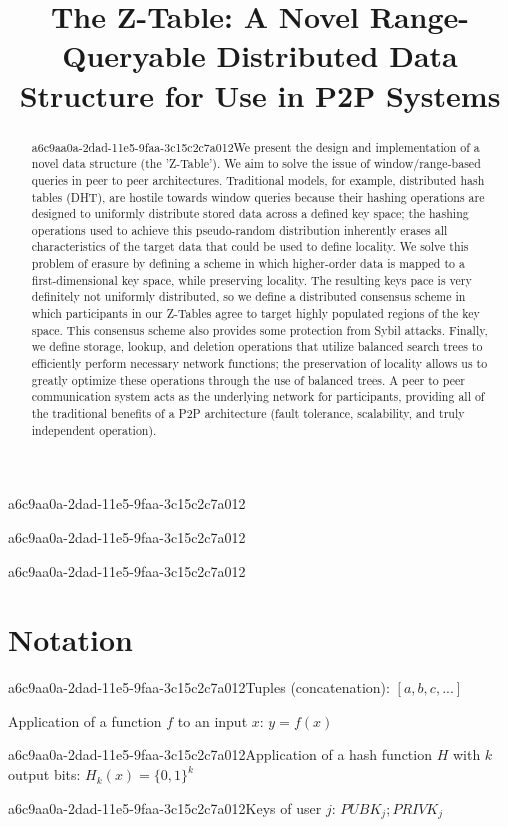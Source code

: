 \documentclass[12pt]{article}
\title{The Z-Table: A Novel Range-Queryable Distributed Data Structure for Use in P2P Systems}
\begin{document}
a6c9aa0a-2dad-11e5-9faa-3c15c2c7a012
\maketitle
a6c9aa0a-2dad-11e5-9faa-3c15c2c7a012
\begin{abstract}
a6c9aa0a-2dad-11e5-9faa-3c15c2c7a012We present the design and implementation of a novel data structure (the 'Z-Table'). We aim to solve the issue of window/range-based queries in peer to peer architectures. Traditional models, for example,  distributed hash tables (DHT), are hostile towards window queries because their hashing operations are designed to uniformly distribute stored data across a defined key space; the hashing operations used to achieve this pseudo-random distribution inherently erases all characteristics of the target data that could be used to define locality. We solve this problem of erasure by defining a scheme in which higher-order data is mapped to a first-dimensional key space, while preserving locality. The resulting keys pace is very definitely not uniformly distributed, so we define a distributed consensus scheme in which participants in our Z-Tables agree to target highly populated regions of the key space. This consensus scheme also provides some protection from Sybil attacks. Finally, we define storage, lookup, and deletion operations that utilize balanced search trees to efficiently perform necessary network functions; the preservation of locality allows us to greatly optimize these operations through the use of balanced trees. A peer to peer communication system acts as the underlying network for participants, providing all of the traditional benefits of a P2P architecture (fault tolerance, scalability, and truly independent operation).
\end{abstract}

a6c9aa0a-2dad-11e5-9faa-3c15c2c7a012\section{Notation}

a6c9aa0a-2dad-11e5-9faa-3c15c2c7a012Tuples (concatenation): $[a,b,c,...]$

Application of a function $f$ to an input $x$: $y=f(x)$

a6c9aa0a-2dad-11e5-9faa-3c15c2c7a012Application of a hash function $H$ with $k$ output bits: $H_{k}(x) = \{0,1\}^k$

a6c9aa0a-2dad-11e5-9faa-3c15c2c7a012Keys of user $j$: $ PUBK_j; PRIVK_j $
\end{document}
